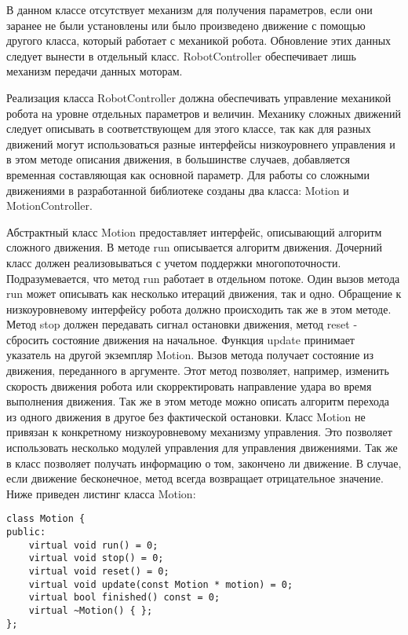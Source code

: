 В данном классе отсутствует механизм для получения параметров, если они заранее не были установлены или было произведено движение с помощью другого класса, который работает с механикой робота. Обновление этих данных следует вынести в отдельный класс. RobotController обеспечивает лишь механизм передачи данных моторам.

Реализация класса RobotController должна обеспечивать управление механикой робота на уровне отдельных параметров и величин. Механику сложных движений следует описывать в соответствующем для этого классе, так как для разных движений могут использоваться разные интерфейсы низкоуровнего управления и в этом методе описания движения, в большинстве случаев, добавляется временная составляющая как основной параметр. Для работы со сложными движениями в разработанной библиотеке созданы два класса: Motion и MotionController.

Абстрактный класс Motion предоставляет интерфейс, описывающий алгоритм сложного движения. В методе run описывается алгоритм движения. Дочерний класс должен реализовываться с учетом поддержки многопоточности. Подразумевается, что метод run работает в отдельном потоке. Один вызов метода run может описывать как несколько итераций движения, так и одно. Обращение к низкоуровневому интерфейсу робота должно происходить так же в этом методе. Метод stop должен передавать сигнал остановки движения, метод reset - сбросить состояние движения на начальное. Функция update принимает указатель на другой экземпляр Motion. Вызов метода получает состояние из движения, переданного в аргументе. Этот метод позволяет, например, изменить скорость движения робота или скорректировать направление удара во время выполнения движения. Так же в этом методе можно описать алгоритм перехода из одного движения в другое без фактической остановки. Класс Motion не привязан к конкретному низкоуровневому механизму управления. Это позволяет использовать несколько модулей управления для управления движениями. Так же в класс позволяет получать информацию о том, закончено ли движение. В случае, если движение бесконечное, метод всегда возвращает отрицательное значение. Ниже приведен листинг класса Motion:

\lstset{language=C++}
\begin{lstlisting}
class Motion {
public:
    virtual void run() = 0;
    virtual void stop() = 0;
    virtual void reset() = 0;
    virtual void update(const Motion * motion) = 0;
    virtual bool finished() const = 0;
    virtual ~Motion() { };
};
\end{lstlisting}

